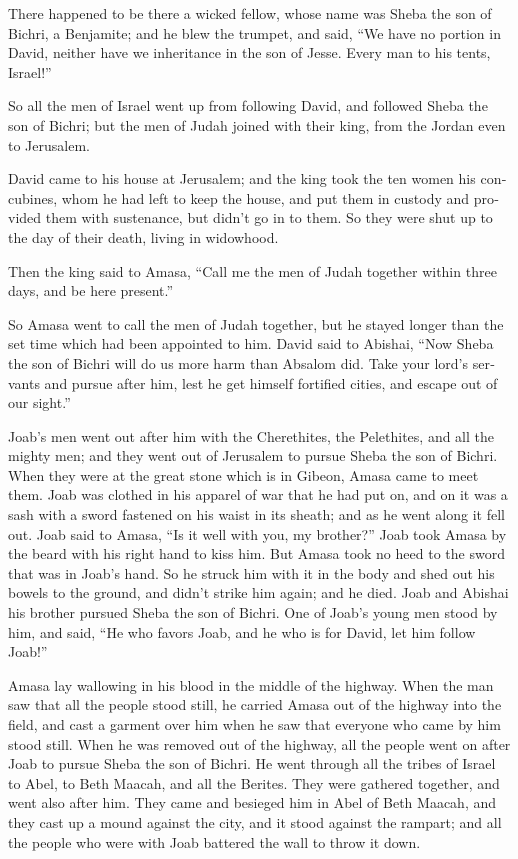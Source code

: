 \begin{paracol}{2}
\begin{otherlanguage}{english}
 There happened to be there a wicked fellow, whose name
was Sheba the son of Bichri, a Benjamite; and he blew the trumpet, and
said, ``We have no portion in David, neither have we inheritance in the
son of Jesse. Every man to his tents, Israel!''

 So all the men of Israel went up from following David,
and followed Sheba the son of Bichri; but the men of Judah joined with
their king, from the Jordan even to Jerusalem.

 David came to his house at Jerusalem; and the king took
the ten women his concubines, whom he had left to keep the house, and
put them in custody and provided them with sustenance, but didn't go in
to them. So they were shut up to the day of their death, living in
widowhood.

 Then the king said to Amasa, ``Call me the men of Judah
together within three days, and be here present.''

 So Amasa went to call the men of Judah together, but he
stayed longer than the set time which had been appointed to him.
 David said to Abishai, ``Now Sheba the son of Bichri will
do us more harm than Absalom did. Take your lord's servants and pursue
after him, lest he get himself fortified cities, and escape out of our
sight.''

 Joab's men went out after him with the Cherethites, the
Pelethites, and all the mighty men; and they went out of Jerusalem to
pursue Sheba the son of Bichri.  When they were at the
great stone which is in Gibeon, Amasa came to meet them. Joab was
clothed in his apparel of war that he had put on, and on it was a sash
with a sword fastened on his waist in its sheath; and as he went along
it fell out.  Joab said to Amasa, ``Is it well with you,
my brother?'' Joab took Amasa by the beard with his right hand to kiss
him.  But Amasa took no heed to the sword that was in
Joab's hand. So he struck him with it in the body and shed out his
bowels to the ground, and didn't strike him again; and he died. Joab and
Abishai his brother pursued Sheba the son of Bichri.  One
of Joab's young men stood by him, and said, ``He who favors Joab, and he
who is for David, let him follow Joab!''

 Amasa lay wallowing in his blood in the middle of the
highway. When the man saw that all the people stood still, he carried
Amasa out of the highway into the field, and cast a garment over him
when he saw that everyone who came by him stood still. 
When he was removed out of the highway, all the people went on after
Joab to pursue Sheba the son of Bichri.  He went through
all the tribes of Israel to Abel, to Beth Maacah, and all the Berites.
They were gathered together, and went also after him. 
They came and besieged him in Abel of Beth Maacah, and they cast up a
mound against the city, and it stood against the rampart; and all the
people who were with Joab battered the wall to throw it down.


\end{otherlanguage}
\end{paracol}

